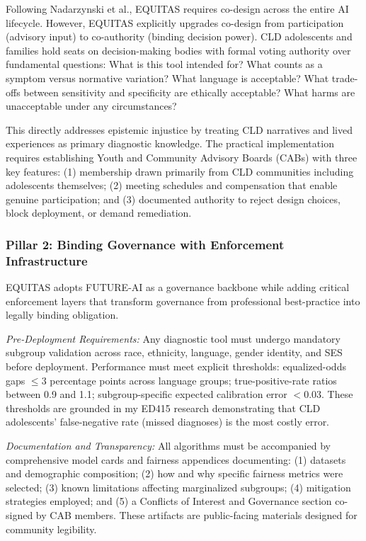 \documentclass[12pt,a4paper]{article}
\begin{document}
Following Nadarzynski et al., EQUITAS requires co-design across the entire AI lifecycle.\cite{nadarzynski2024} However, EQUITAS explicitly upgrades co-design from participation (advisory input) to co-authority (binding decision power). CLD adolescents and families hold seats on decision-making bodies with formal voting authority over fundamental questions: What is this tool intended for? What counts as a symptom versus normative variation? What language is acceptable? What trade-offs between sensitivity and specificity are ethically acceptable? What harms are unacceptable under any circumstances?

This directly addresses epistemic injustice by treating CLD narratives and lived experiences as primary diagnostic knowledge.\cite{garcia_ed415} The practical implementation requires establishing Youth and Community Advisory Boards (CABs) with three key features: (1) membership drawn primarily from CLD communities including adolescents themselves; (2) meeting schedules and compensation that enable genuine participation; and (3) documented authority to reject design choices, block deployment, or demand remediation.\cite{nadarzynski2024}

\subsubsection{Pillar 2: Binding Governance with Enforcement Infrastructure}

EQUITAS adopts FUTURE-AI as a governance backbone while adding critical enforcement layers that transform governance from professional best-practice into legally binding obligation.\cite{lekadir2025}

\textit{Pre-Deployment Requirements:} Any diagnostic tool must undergo mandatory subgroup validation across race, ethnicity, language, gender identity, and SES before deployment.\cite{chen2023} Performance must meet explicit thresholds: equalized-odds gaps $\leq 3$ percentage points across language groups; true-positive-rate ratios between 0.9 and 1.1; subgroup-specific expected calibration error $< 0.03$.\cite{chen2023} These thresholds are grounded in my ED415 research demonstrating that CLD adolescents' false-negative rate (missed diagnoses) is the most costly error.\cite{garcia_ed415}

\textit{Documentation and Transparency:} All algorithms must be accompanied by comprehensive model cards and fairness appendices documenting: (1) datasets and demographic composition; (2) how and why specific fairness metrics were selected; (3) known limitations affecting marginalized subgroups; (4) mitigation strategies employed; and (5) a Conflicts of Interest and Governance section co-signed by CAB members.\cite{chen2023} These artifacts are public-facing materials designed for community legibility.\cite{lekadir2025}
\end{document}
